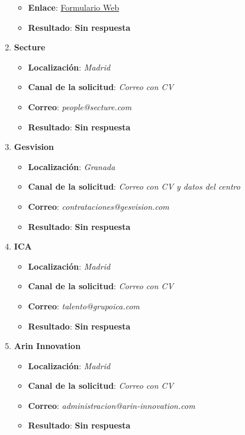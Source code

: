 \begin{enumerate}
\begin{itemize}
		\item \textbf{Enlace}: \href{https://be.knowmadmood.com/}{Formulario Web}
		\item \textbf{Resultado}: {\color{orange} \textbf{Sin respuesta}}
	\end{itemize}
	\item \textbf{Secture}
	\begin{itemize}
		\item \textbf{Localización}: \textit{Madrid}
		\item \textbf{Canal de la solicitud}: \textit{Correo con CV}
		\item \textbf{Correo}: \textit{people@secture.com}
		\item \textbf{Resultado}: {\color{orange} \textbf{Sin respuesta}}
	\end{itemize}
 	\item \textbf{Gesvision}
	\begin{itemize}
		\item \textbf{Localización}: \textit{Granada}
		\item \textbf{Canal de la solicitud}: \textit{Correo con CV y datos del centro}
		\item \textbf{Correo}: \textit{contrataciones@gesvision.com}
		\item \textbf{Resultado}: {\color{orange} \textbf{Sin respuesta}}
	\end{itemize}
	\item \textbf{ICA}
	\begin{itemize}
		\item \textbf{Localización}: \textit{Madrid}
		\item \textbf{Canal de la solicitud}: \textit{Correo con CV}
		\item \textbf{Correo}: \textit{talento@grupoica.com}
		\item \textbf{Resultado}: {\color{orange} \textbf{Sin respuesta}}
	\end{itemize}
	\item \textbf{Arin Innovation}
	\begin{itemize}
		\item \textbf{Localización}: \textit{Madrid}
		\item \textbf{Canal de la solicitud}: \textit{Correo con CV}
		\item \textbf{Correo}: \textit{administracion@arin-innovation.com}
		\item \textbf{Resultado}: {\color{orange} \textbf{Sin respuesta}}
	\end{itemize}

\end{enumerate}
